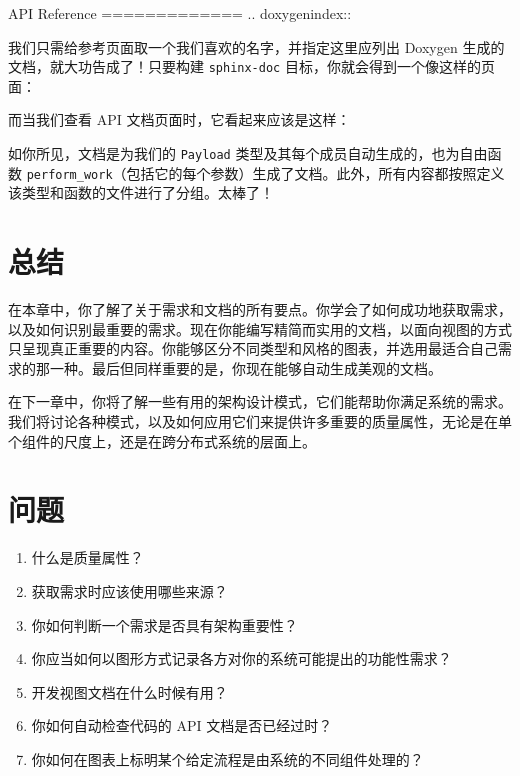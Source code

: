 \begin{codebox}[text]
API Reference
=============
.. doxygenindex::
\end{codebox}

\label{idx:259}
我们只需给参考页面取一个我们喜欢的名字，并指定这里应列出 Doxygen 生成的文档，就大功告成了！只要构建 \texttt{sphinx-doc} 目标，你就会得到一个像这样的页面：


而当我们查看 API 文档页面时，它看起来应该是这样：


\label{idx:260}
如你所见，文档是为我们的 \texttt{Payload} 类型及其每个成员自动生成的，也为自由函数 \texttt{perform\_\allowbreak{}work}（包括它的每个参数）生成了文档。此外，所有内容都按照定义该类型和函数的文件进行了分组。太棒了！

\section{总结}

在本章中，你了解了关于需求和文档的所有要点。你学会了如何成功地获取需求，以及如何识别最重要的需求。现在你能编写精简而实用的文档，以面向视图的方式只呈现真正重要的内容。你能够区分不同类型和风格的图表，并选用最适合自己需求的那一种。最后但同样重要的是，你现在能够自动生成美观的文档。

在下一章中，你将了解一些有用的架构设计模式，它们能帮助你满足系统的需求。我们将讨论各种模式，以及如何应用它们来提供许多重要的质量属性，无论是在单个组件的尺度上，还是在跨分布式系统的层面上。

\section{问题}

\begin{enumerate}
\item 什么是质量属性？
\item 获取需求时应该使用哪些来源？
\item 你如何判断一个需求是否具有架构重要性？
\item 你应当如何以图形方式记录各方对你的系统可能提出的功能性需求？
\item 开发视图文档在什么时候有用？
\item 你如何自动检查代码的 API 文档是否已经过时？
\item 你如何在图表上标明某个给定流程是由系统的不同组件处理的？
\end{enumerate}

